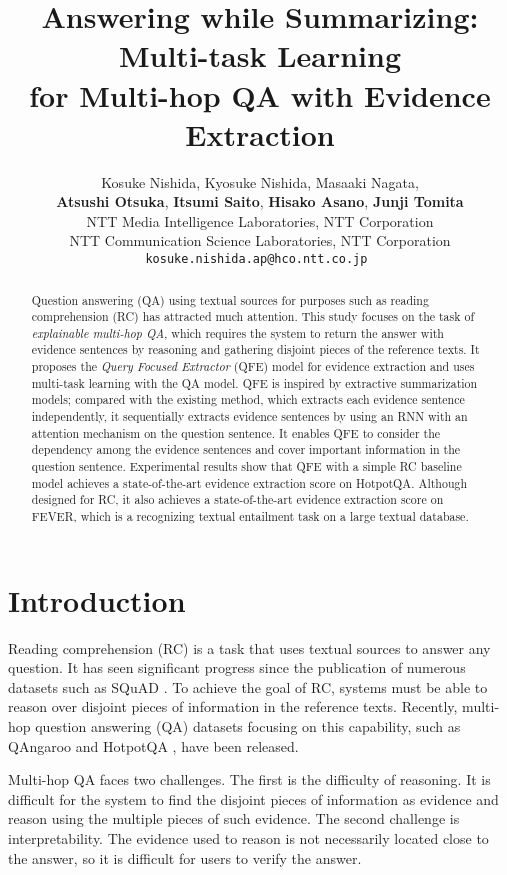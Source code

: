 \documentclass[11pt,a4paper]{article}
\title{Answering while Summarizing: Multi-task Learning  \\ for Multi-hop QA with Evidence Extraction}
\author{
		Kosuke Nishida,
		Kyosuke Nishida,
		Masaaki Nagata,\\
		\textbf{Atsushi Otsuka},
		\textbf{Itsumi Saito},
		\textbf{Hisako Asano},
		\textbf{Junji Tomita}\\
		 \rm NTT Media Intelligence Laboratories, NTT Corporation\\
 \rm NTT Communication Science Laboratories, NTT Corporation\\
\tt kosuke.nishida.ap@hco.ntt.co.jp
}
\date{}
\theoremstyle{definition}
\begin{document}
	\maketitle
	\begin{abstract}
	Question answering (QA) using textual sources for purposes such as reading comprehension (RC) has attracted much attention. This study focuses on the task of \textit{explainable multi-hop QA}, which requires the system to return the answer with evidence sentences by reasoning and gathering disjoint pieces of the reference texts. It proposes the \textit{Query Focused Extractor} (QFE) model for evidence extraction and uses multi-task learning with the QA model. QFE is inspired by extractive summarization models; compared with the existing method, which extracts each evidence sentence independently, it sequentially extracts evidence sentences by using an RNN with an attention mechanism on the question sentence. It enables QFE to consider the dependency among the evidence sentences and cover important information in the question sentence. Experimental results show that QFE with a simple RC baseline model achieves a state-of-the-art evidence extraction score on HotpotQA. Although designed for RC, it also achieves a state-of-the-art evidence extraction score on FEVER, which is a recognizing textual entailment task on a large textual database.
	\end{abstract}
	
	\section{Introduction}
	Reading comprehension (RC) is a task that uses textual sources to answer any question. It has seen significant progress since the publication of numerous datasets such as SQuAD \cite{squad}.
	To achieve the goal of RC, systems must be able to reason over disjoint pieces of information in the reference texts. 
	Recently, multi-hop question answering (QA) datasets focusing on this capability, such as QAngaroo \cite{qangaroo} and HotpotQA \cite{hotpot}, have been released.

    Multi-hop QA faces two challenges. 
    The first is the difficulty of reasoning.
    It is difficult for the system to find the disjoint pieces of information as evidence and reason using the multiple pieces of such evidence. The second challenge is interpretability. The evidence used to reason is not necessarily located close to the answer, so it is difficult for users to verify the answer.
\end{document}
